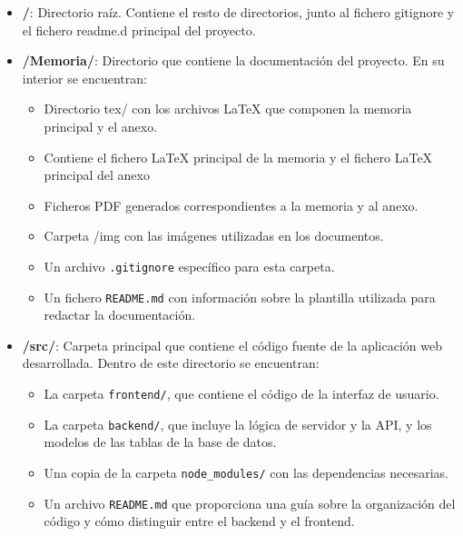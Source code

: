 \begin{itemize}
	
	\item \textbf{/}: Directorio raíz. Contiene el resto de directorios, junto al fichero gitignore y el fichero readme.d principal del proyecto.
	
    \item \textbf{/Memoria/}: Directorio que contiene la documentación del proyecto. En su interior se encuentran:

    \begin{itemize}
        \item Directorio tex/ con los archivos \LaTeX{} que componen la memoria principal y el anexo.
        \item Contiene el fichero \LaTeX{} principal de la memoria y el fichero \LaTeX{} principal del anexo
        \item Ficheros PDF generados correspondientes a la memoria y al anexo.
        \item Carpeta /img con las imágenes utilizadas en los documentos.
        \item Un archivo \texttt{.gitignore} específico para esta carpeta.
        \item Un fichero \texttt{README.md} con información sobre la plantilla utilizada para redactar la documentación.
    \end{itemize}
    
    \item \textbf{/src/}: Carpeta principal que contiene el código fuente de la aplicación web desarrollada. Dentro de este directorio se encuentran:
    
    \begin{itemize}
          \item La carpeta \texttt{frontend/}, que contiene el código de la interfaz de usuario.
          \item La carpeta \texttt{backend/}, que incluye la lógica de servidor y la API, y los modelos de las tablas de la base de datos.
          \item Una copia de la carpeta \texttt{node\_modules/} con las dependencias necesarias.
          \item Un archivo \texttt{README.md} que proporciona una guía sobre la organización del código y cómo distinguir entre el backend y el frontend.
        \end{itemize}
    	
    \end{itemize}

